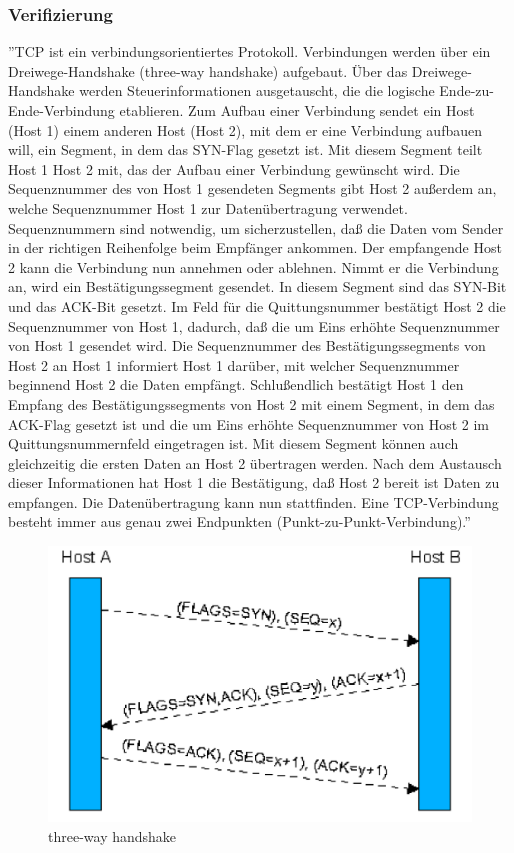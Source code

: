 \subsubsection{Verifizierung}
''TCP ist ein verbindungsorientiertes Protokoll. Verbindungen werden über ein Dreiwege-Handshake (three-way handshake) aufgebaut. Über das Dreiwege-Handshake werden Steuerinformationen ausgetauscht, die die logische Ende-zu-Ende-Verbindung etablieren. Zum Aufbau einer Verbindung sendet ein Host (Host 1) einem anderen Host (Host 2), mit dem er eine Verbindung aufbauen will, ein Segment, in dem das SYN-Flag gesetzt ist. Mit diesem Segment teilt Host 1 Host 2 mit, das der Aufbau einer Verbindung gewünscht wird. Die Sequenznummer des von Host 1 gesendeten Segments gibt Host 2 außerdem an, welche Sequenznummer Host 1 zur Datenübertragung verwendet. Sequenznummern sind notwendig, um sicherzustellen, daß die Daten vom Sender in der richtigen Reihenfolge beim Empfänger ankommen. Der empfangende Host 2 kann die Verbindung nun annehmen oder ablehnen. Nimmt er die Verbindung an, wird ein Bestätigungssegment gesendet. In diesem Segment sind das SYN-Bit und das ACK-Bit gesetzt. Im Feld für die Quittungsnummer bestätigt Host 2 die Sequenznummer von Host 1, dadurch, daß die um Eins erhöhte Sequenznummer von Host 1 gesendet wird. Die Sequenznummer des Bestätigungssegments von Host 2 an Host 1 informiert Host 1 darüber, mit welcher Sequenznummer beginnend Host 2 die Daten empfängt. Schlußendlich bestätigt Host 1 den Empfang des Bestätigungssegments von Host 2 mit einem Segment, in dem das ACK-Flag gesetzt ist und die um Eins erhöhte Sequenznummer von Host 2 im Quittungsnummernfeld eingetragen ist. Mit diesem Segment können auch gleichzeitig die ersten Daten an Host 2 übertragen werden. Nach dem Austausch dieser Informationen hat Host 1 die Bestätigung, daß Host 2 bereit ist Daten zu empfangen. Die Datenübertragung kann nun stattfinden. Eine TCP-Verbindung besteht immer aus genau zwei Endpunkten (Punkt-zu-Punkt-Verbindung).'' \cite{noauthor_einfuhrung_nodate}
\begin{figure}
\begin{center}
    \includegraphics[scale=0.35]{images/ThreeWayHandshake.png} 
\end{center}
    \caption{three-way handshake \cite{noauthor_einfuhrung_nodate}}
    \label{img:three-way handshake}
    
\end{figure}
